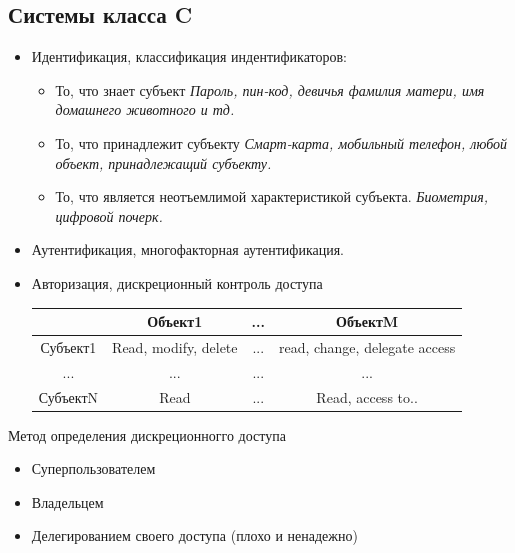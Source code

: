 \documentclass{article}
\begin{document}
\subsection{Системы класса C}
\begin{itemize}
    \item Идентификация, классификация индентификаторов: 
    \begin{itemize}
        \item То, что знает субъект
        \newline \textit{Пароль, пин-код, девичья фамилия матери, имя домашнего животного и тд.}
        \item То, что принадлежит субъекту
        \newline \textit{Смарт-карта, мобильный телефон, любой объект, принадлежащий субъекту.}
        \item То, что является неотъемлимой характеристикой субъекта.
        \newline \textit{Биометрия, цифровой почерк.}
    \end{itemize}
    \item Аутентификация, многофакторная аутентификация.
\end{itemize}

\begin{itemize}
    \item Авторизация, дискреционный контроль доступа
    \newline
    \newline
    \begin{tabular}{|c|c|c|c|}
        \hline
        & Объект1 & ... & ОбъектM\\
        \hline
        Субъект1 & Read, modify, delete & ... & read, change, delegate access \\ 
        \hline
        ... & ... & ... & ... \\  
        \hline
        СубъектN & Read & ... & Read, access to..    \\
        \hline
    \end{tabular}
    \end{itemize}
    Метод определения дискреционногго доступа
    \begin{itemize}
        \item Суперпользователем
        \item Владельцем
        \item Делегированием своего доступа (плохо и ненадежно)
    \end{itemize}
    
\end{document}
